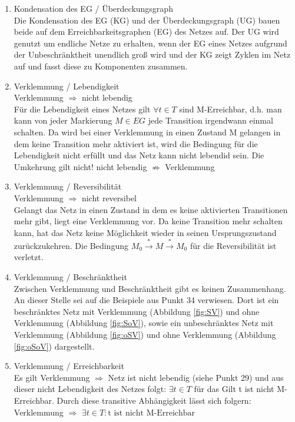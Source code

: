 \documentclass[10pt]{scrartcl}
\begin{document}
\begin{enumerate}
\item{Kondensation des EG  / Überdeckungsgraph}\\
Die Kondensation des EG (KG) und der Überdeckungsgraph (UG) bauen beide auf dem Erreichbarkeitsgraphen (EG) des Netzes auf. Der UG wird genutzt um endliche Netze zu erhalten, wenn der EG eines Netzes aufgrund der Unbeschränktheit unendlich groß wird und der KG zeigt Zyklen im Netz auf und fasst diese zu Komponenten zusammen.

\item{Verklemmung / Lebendigkeit}\\
Verklemmung $\Rightarrow$ nicht lebendig\\
Für die Lebendigkeit eines Netzes gilt $\forall t \in T$ sind M-Erreichbar, d.h. man kann von jeder Markierung $M \in EG$ jede Transition irgendwann einmal schalten. Da wird bei einer Verklemmung in einen Zustand M gelangen in dem keine Transition mehr aktiviert ist, wird die Bedingung für die Lebendigkeit nicht erfüllt und das Netz kann nicht lebendid sein.
Die Umkehrung gilt nicht! nicht lebendig $\nRightarrow$ Verklemmung

\item{Verklemmung / Reversibilität}\\
Verklemmung $\Rightarrow$ nicht reversibel\\
Gelangt das Netz in einen Zustand in dem es keine aktivierten Transitionen mehr gibt, liegt eine Verklemmung vor. Da keine Transition mehr schalten kann, hat das Netz keine Möglichkeit wieder in seinen Ursprungszustand zurückzukehren. Die Bedingung $M_{0} \overset{*}{\rightarrow} M \overset{*}{\rightarrow} M_{0}$ für die Reversibilität ist verletzt.

\item{Verklemmung / Beschränktheit}\\
Zwischen Verklemmung und Beschränktheit gibt es keinen Zusammenhang. An dieser Stelle sei auf die Beispiele aus Punkt 34 verwiesen. Dort ist ein beschränktes Netz mit Verklemmung (Abbildung \ref{fig:SV}) und ohne Verklemmung (Abbildung \ref{fig:SoV}), sowie ein unbeschränktes Netz mit Verklemmung (Abbildung \ref{fig:oSV}) und ohne Verklemmung (Abbildung \ref{fig:oSoV}) dargestellt.

\item{Verklemmung / Erreichbarkeit}\\
Es gilt Verklemmung $\Rightarrow$ Netz ist nicht lebendig (siehe Punkt 29) und aus dieser nicht Lebendigkeit des Netzes folgt: $\exists t \in T$ für das Gilt t ist nicht M-Erreichbar. Durch diese transitive Abhängigkeit lässt sich folgern:\\
Verklemmung $\Rightarrow$ $\exists t \in T :\text{t ist nicht M-Erreichbar}$


\end{enumerate}
\end{document}
